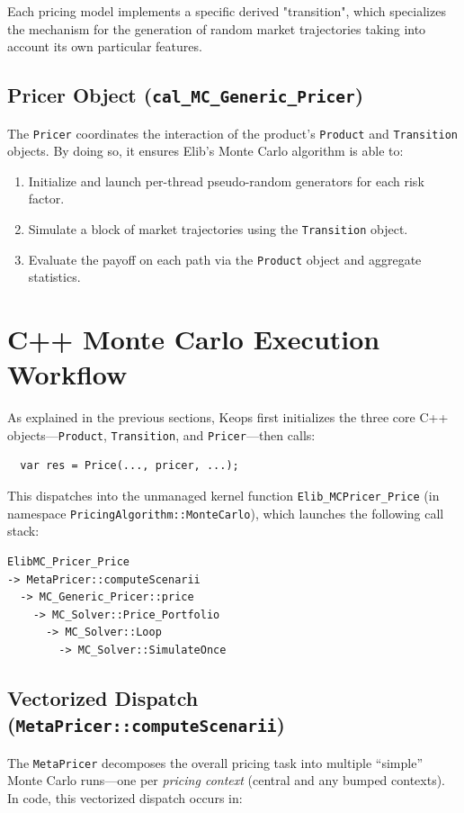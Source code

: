 \documentclass[11pt]{article}
\begin{document}
Each pricing model implements a specific derived "transition", which specializes the
mechanism for the generation of random market trajectories taking into account its own particular features.

\subsection{Pricer Object (\texttt{cal\_MC\_Generic\_Pricer})}
The \texttt{Pricer} coordinates the interaction of the product's \texttt{Product} and \texttt{Transition} objects. By doing so, it ensures Elib's Monte Carlo algorithm is able to:

\begin{enumerate}
    \item Initialize and launch per-thread pseudo-random generators for each risk factor.

    \item Simulate a block of market trajectories using the \texttt{Transition} object.
    
    \item Evaluate the payoff on each path via the \texttt{Product} object and aggregate statistics.
\end{enumerate}


\section{C++ Monte Carlo Execution Workflow}

As explained in the previous sections, Keops first initializes the three core C++ objects—\texttt{Product}, \texttt{Transition}, and \texttt{Pricer}—then calls:
\begin{verbatim}
  var res = Price(..., pricer, ...);
\end{verbatim}
This dispatches into the unmanaged kernel function
\verb|Elib_MCPricer_Price| (in namespace \texttt{PricingAlgorithm::MonteCarlo}), which launches the following call stack:

\begin{verbatim}
ElibMC_Pricer_Price
-> MetaPricer::computeScenarii
  -> MC_Generic_Pricer::price
    -> MC_Solver::Price_Portfolio
      -> MC_Solver::Loop
        -> MC_Solver::SimulateOnce
\end{verbatim}

\subsection{Vectorized Dispatch (\texttt{MetaPricer::computeScenarii})}
The \texttt{MetaPricer} decomposes the overall pricing task into multiple “simple” Monte Carlo runs—one per \emph{pricing context} (central and any bumped contexts). In code, this vectorized dispatch occurs in:
\end{document}

